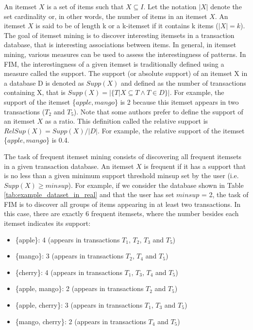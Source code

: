 An itemset $X$ is a set of items such that $X \subseteq I$. Let the notation $|X|$ denote the set
cardinality or, in other words, the number of items in an itemset $X$. An itemset $X$ is said
to be of length k or a k-itemset if it contains k items ($|X| = k$).
The goal of itemset mining is to discover interesting itemsets in a transaction database,
that is interesting associations between items.
In general, in itemset mining, various measures can be used to assess the
interestingness of patterns. In FIM, the interestingness of a given itemset is traditionally
defined using a measure called the support. The support (or absolute support) of an itemset
X in a database D is denoted as $Supp(X)$ and defined as the number of transactions containing
X, that is $Supp(X) = |\{T|X \subseteq T \wedge T \in D\}|$.
For example, the support of the itemset \{$apple, mango$\} is 2 because this itemset appears in two transactions ($T_2$ and $T_5$).
Note that some authors prefer to define the support of an itemset $X$ as a ratio. This definition called the relative
support is $RelSup(X) = Supp(X)/|D|$. For example, the relative support of the itemset \{$apple, mango$\}
is 0.4.

The task of frequent itemset mining consists of discovering all frequent itemsets in a
given transaction database. An itemset $X$ is frequent if it has a support that is no less than
a given minimum support threshold minsup set by the user (i.e. $Supp(X) \geq minsup$). For
example, if we consider the database shown in Table \ref{tab:example_dataset_in_real} and that the user has set $minsup$ = 2,
the task of FIM is to discover all groups of items appearing in at least two transactions. In
this case, there are exactly 6 frequent itemsets, where the number besides each itemset indicates
its support:
\begin{itemize}
    \item \{apple\}: 4 (appears in transactions $T_1$, $T_2$, $T_3$ and $T_5$)
    \item \{mango\}: 3 (appears in transactions $T_2$, $T_4$ and $T_5$)
    \item \{cherry\}: 4 (appears in transactions $T_1$, $T_3$, $T_4$ and $T_5$)
    \item \{apple, mango\}: 2 (appears in transactions $T_2$ and $T_5$)
    \item \{apple, cherry\}: 3 (appears in transactions $T_1$, $T_3$ and $T_5$)
    \item \{mango, cherry\}: 2 (appears in transactions $T_4$ and $T_5$)
\end{itemize}

